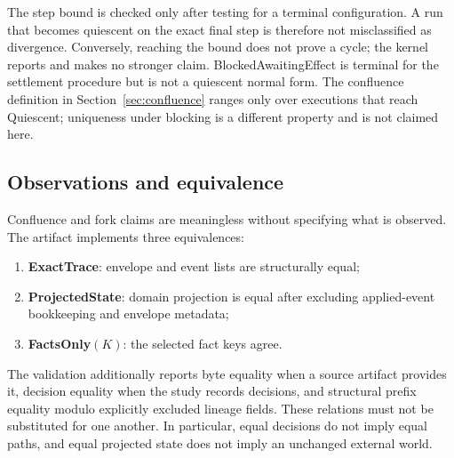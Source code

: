 The step bound is checked only after testing for a terminal configuration.  A
run that becomes quiescent on the exact final step is therefore not
misclassified as divergence.  Conversely, reaching the bound does not prove a
cycle; the kernel reports  and makes no stronger claim.
BlockedAwaitingEffect is terminal for the settlement procedure but is not a
quiescent normal form.  The confluence definition in Section~\ref{sec:confluence}
ranges only over executions that reach Quiescent; uniqueness under blocking is
a different property and is not claimed here.

\subsection{Observations and equivalence}

Confluence and fork claims are meaningless without specifying what is observed.
The artifact implements three equivalences:

\begin{enumerate}[leftmargin=*]
  \item \textbf{ExactTrace}: envelope and event lists are structurally equal;
  \item \textbf{ProjectedState}: domain projection is equal after excluding
  applied-event bookkeeping and envelope metadata;
  \item \textbf{FactsOnly}$(K)$: the selected fact keys agree.
\end{enumerate}

The validation additionally reports byte equality when a source artifact
provides it, decision equality when the study records decisions, and structural
prefix equality modulo explicitly excluded lineage fields.  These relations
must not be substituted for one another.  In particular, equal decisions do
not imply equal paths, and equal projected state does not imply an unchanged
external world.
